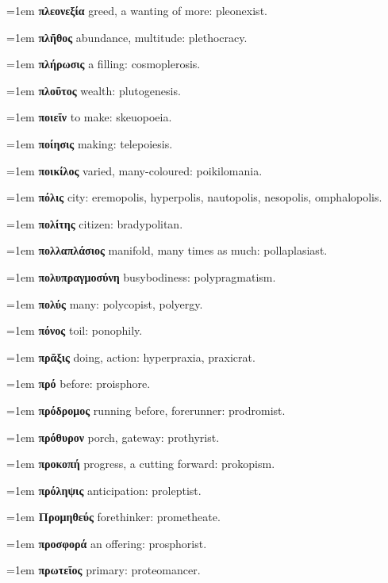 \hangindent=1em \textbf{πλεονεξία} greed, a wanting of more: pleonexist.\par
\hangindent=1em \textbf{πλῆθος} abundance, multitude: plethocracy.\par
\hangindent=1em \textbf{πλήρωσις} a filling: cosmoplerosis.\par
\hangindent=1em \textbf{πλοῦτος} wealth: plutogenesis.\par
\hangindent=1em \textbf{ποιεῖν} to make: skeuopoeia.\par
\hangindent=1em \textbf{ποίησις} making: telepoiesis.\par
\hangindent=1em \textbf{ποικίλος} varied, many-coloured: poikilomania.\par
\hangindent=1em \textbf{πόλις} city: eremopolis, hyperpolis, nautopolis, nesopolis, omphalopolis.\par
\hangindent=1em \textbf{πολίτης} citizen: bradypolitan.\par
\hangindent=1em \textbf{πολλαπλάσιος} manifold, many times as much: pollaplasiast.\par
\hangindent=1em \textbf{πολυπραγμοσύνη} busybodiness: polypragmatism.\par
\hangindent=1em \textbf{πολύς} many: polycopist, polyergy.\par
\hangindent=1em \textbf{πόνος} toil: ponophily.\par
\hangindent=1em \textbf{πρᾶξις} doing, action: hyperpraxia, praxicrat.\par
\hangindent=1em \textbf{πρό} before: proisphore.\par
\hangindent=1em \textbf{πρόδρομος} running before, forerunner: prodromist.\par
\hangindent=1em \textbf{πρόθυρον} porch, gateway: prothyrist.\par
\hangindent=1em \textbf{προκοπή} progress, a cutting forward: prokopism.\par
\hangindent=1em \textbf{πρόληψις} anticipation: proleptist.\par
\hangindent=1em \textbf{Προμηθεύς} forethinker: prometheate.\par
\hangindent=1em \textbf{προσφορά} an offering: prosphorist.\par
\hangindent=1em \textbf{πρωτεῖος} primary: proteomancer.\par
